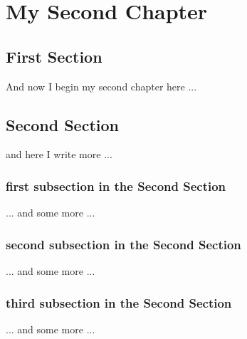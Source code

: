 \chapter{My Second Chapter}
\ifpdf
    \graphicspath{{Chapter2/Chapter2Figs/PNG/}{Chapter2/Chapter2Figs/PDF/}{Chapter2/Chapter2Figs/}}
\else
    \graphicspath{{Chapter2/Chapter2Figs/EPS/}{Chapter2/Chapter2Figs/}}
\fi

\section{First Section}
And now I begin my second chapter here ...

\section{Second Section}
and here I write more ...

\subsection{first subsection in the Second Section}
... and some more ...

\subsection{second subsection in the Second Section}
... and some more ...

\subsection{third subsection in the Second Section}
... and some more ...


